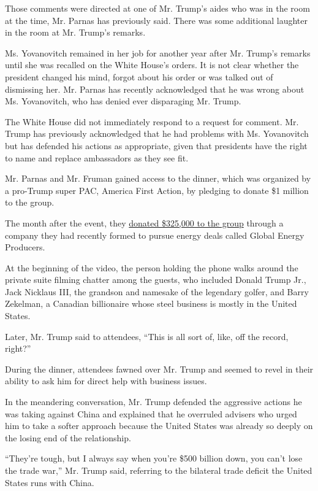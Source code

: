 Those comments were directed at one of Mr. Trump's aides who was in the
room at the time, Mr. Parnas has previously said. There was some
additional laughter in the room at Mr. Trump's remarks.

Ms. Yovanovitch remained in her job for another year after Mr. Trump's
remarks until she was recalled on the White House's orders. It is not
clear whether the president changed his mind, forgot about his order or
was talked out of dismissing her. Mr. Parnas has recently acknowledged
that he was wrong about Ms. Yovanovitch, who has denied ever disparaging
Mr. Trump.

The White House did not immediately respond to a request for comment.
Mr. Trump has previously acknowledged that he had problems with Ms.
Yovanovitch but has defended his actions as appropriate, given that
presidents have the right to name and replace ambassadors as they see
fit.

Mr. Parnas and Mr. Fruman gained access to the dinner, which was
organized by a pro-Trump super PAC, America First Action, by pledging to
donate \$1 million to the group.

The month after the event, they
\href{http://docquery.fec.gov/cgi-bin/fecimg/?201807159115673127}{donated
\$325,000 to the group} through a company they had recently formed to
pursue energy deals called Global Energy Producers.

At the beginning of the video, the person holding the phone walks around
the private suite filming chatter among the guests, who included Donald
Trump Jr., Jack Nicklaus III, the grandson and namesake of the legendary
golfer, and Barry Zekelman, a Canadian billionaire whose steel business
is mostly in the United States.

Later, Mr. Trump said to attendees, ``This is all sort of, like, off the
record, right?''

During the dinner, attendees fawned over Mr. Trump and seemed to revel
in their ability to ask him for direct help with business issues.

In the meandering conversation, Mr. Trump defended the aggressive
actions he was taking against China and explained that he overruled
advisers who urged him to take a softer approach because the United
States was already so deeply on the losing end of the relationship.

``They're tough, but I always say when you're \$500 billion down, you
can't lose the trade war,'' Mr. Trump said, referring to the bilateral
trade deficit the United States runs with China.

